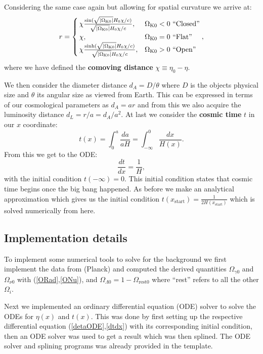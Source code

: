 \documentclass[%
reprint,
 amsmath,amssymb,
 aps,
]{revtex4-2}
\begin{document}
Considering the same case again but allowing for spatial curvature we arrive at:
\[
r=
\begin{cases}
	\,\chi\frac{\sin(\sqrt{\left|\Omega_{\text K0}\right|}H_0\chi/c)}{\sqrt{\left|\Omega_{\text K0}\right|}H_0\chi/c},& \Omega_{\text K0}<0~\text{``Closed''}\\
	\,\chi, & \Omega_{\text K0}=0~\text{``Flat''}\\
	\,\chi\frac{\sinh(\sqrt{\left|\Omega_{\text K0}\right|}H_0\chi/c)}{\sqrt{\left|\Omega_{\text K0}\right|}H_0\chi/c},& \Omega_{\text K0}>0~\text{``Open''}
\end{cases},
\]
where we have defined the \textbf{comoving distance} $\chi\equiv\eta_0-\eta$. 

We then consider the diameter distance $d_A=D/\theta$ where $D$ is the objects physical size and $\theta$ its angular size as viewed from Earth. This can be expressed in terms of our cosmological parameters as $d_A=ar$ and from this we also acquire the  luminosity distance $d_L=r/a=d_A/a^2$. At last we consider the \textbf{cosmic time} $t$ in our $x$ coordinate:
\[t(x)=\int_0^a\frac{da}{aH}=\int_{-\infty}^0\frac{dx}{H(x)}.\]
From this we get to the ODE:
\begin{equation}
	\frac{dt}{dx}=\frac{1}{H}, \label{dtdx}
\end{equation}
with the initial condition $t(-\infty)=0$. This initial condition states that cosmic time begins once the big bang happened. As before we make an analytical approximation which gives us the initial condition $t(x_\text{start})=\frac{1}{2H(x_\text{start})}$ which is solved numerically from here.

\subsection{Implementation details}

To implement some numerical tools to solve for the background we first implement the data from (Planck) and computed the derived quantities $\Omega_{\gamma0}$ and $\Omega_{\nu0}$ with (\ref{ORad},\ref{ONu}), and $\Omega_{\Lambda0}=1-\Omega_\text{rest0}$ where ``rest'' refers to all the other $\Omega_i$.  

Next we implemented an ordinary differential equation (ODE) solver to solve the ODEs for $\eta(x)$ and $t(x)$. This was done by first setting up the respective differential equation (\ref{detaODE},\ref{dtdx}) with its corresponding initial condition, then an ODE solver was used to get a result which was then splined. The ODE solver and splining programs was already provided in the template. 
\end{document}
